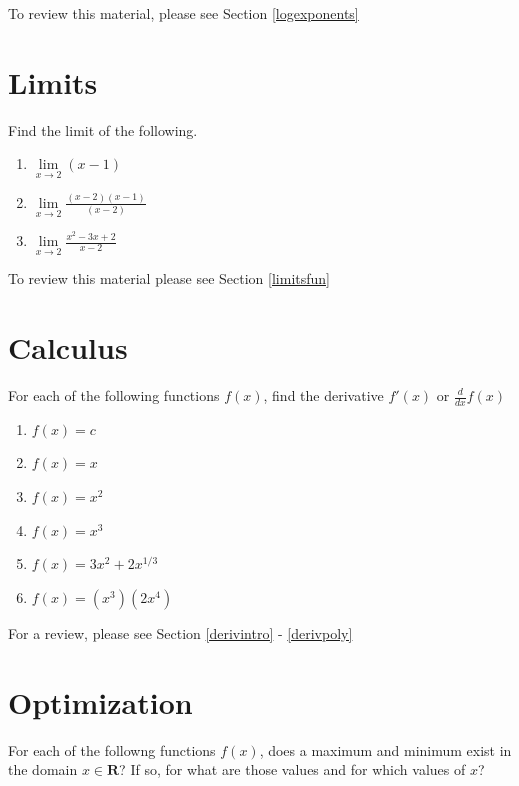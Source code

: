 \documentclass[]{book}
\providecommand{\tightlist}{%
  \setlength{\itemsep}{0pt}\setlength{\parskip}{0pt}}
\theoremstyle{definition}
\theoremstyle{definition}
\theoremstyle{definition}
\theoremstyle{remark}
\begin{document}
To review this material, please see Section \ref{logexponents}

\hypertarget{limits}{%
\section*{Limits}\label{limits}}

Find the limit of the following.

\begin{enumerate}
\def\labelenumi{\arabic{enumi}.}
\tightlist
\item
  \(\lim\limits_{x \to 2} (x - 1)\)
\item
  \(\lim\limits_{x \to 2} \frac{(x - 2) (x - 1)}{(x - 2)}\)
\item
  \(\lim\limits_{x \to 2}\frac{x^2 - 3x + 2}{x- 2}\)
\end{enumerate}

To review this material please see Section \ref{limitsfun}

\hypertarget{calculus}{%
\section*{Calculus}\label{calculus}}

For each of the following functions \(f(x)\), find the derivative \(f'(x)\) or \(\frac{d}{dx}f(x)\)

\begin{enumerate}
\def\labelenumi{\arabic{enumi}.}
\tightlist
\item
  \(f(x)=c\)
\item
  \(f(x)=x\)
\item
  \(f(x)=x^2\)
\item
  \(f(x)=x^3\)
\item
  \(f(x)=3x^2+2x^{1/3}\)
\item
  \(f(x)=(x^3)(2x^4)\)
\end{enumerate}

For a review, please see Section \ref{derivintro} - \ref{derivpoly}

\hypertarget{optimization}{%
\section*{Optimization}\label{optimization}}

For each of the followng functions \(f(x)\), does a maximum and minimum exist in the domain \(x \in \mathbf{R}\)? If so, for what are those values and for which values of \(x\)?
\end{document}
